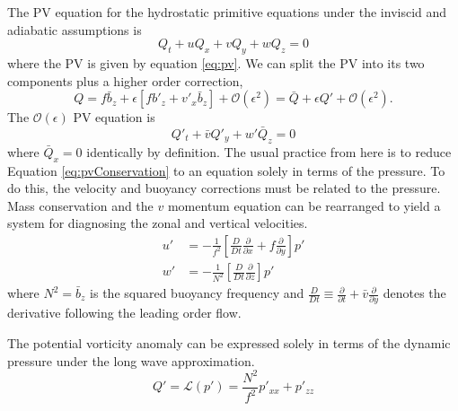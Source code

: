 \documentclass[12pt]{workjournal}
\begin{document}
   The PV equation for the hydrostatic primitive equations under the inviscid and adiabatic assumptions is
   \begin{equation}
   Q_t + uQ_x + vQ_y + wQ_z = 0 \label{eq:strat_pvconservation}
   \end{equation}
where the PV is given by equation \eqref{eq:pv}. We can split the PV into its two components plus a higher order correction,
  \begin{equation}
  Q =  f\bar{b}_z + \epsilon \left[  f b'_z +  v'_x \bar{b}_z \right] + \mathcal{O}(\epsilon^2) = \bar{Q} + \epsilon Q' + \mathcal{O}(\epsilon^2).
  \end{equation}
The $\mathcal{O}(\epsilon)$ PV equation is
  \begin{equation}
  Q'_t + \bar{v} Q'_y + w' \bar{Q}_z = 0 \label{eq:pvConservation}
  \end{equation}  
  where $\bar{Q}_x = 0$ identically by definition. The usual practice from here is to reduce Equation \eqref{eq:pvConservation} to an equation solely in terms of the pressure. To do this, the velocity and buoyancy corrections must be related to the pressure. Mass conservation and the $v$ momentum equation can be rearranged to yield a system for diagnosing the zonal and vertical velocities.
    \begin{subequations}
    \begin{align}
     u'  &= -\frac{1}{ f^2}\left[ \frac{D}{Dt}\frac{\partial}{\partial x}+ f \frac{\partial}{\partial y} \right]p' \\
   w'  &= -\frac{1}{N^2}\left[ \frac{D}{Dt}\frac{\partial }{\partial z}\right] p'
    \end{align}\label{eq:uAndw}
    \end{subequations}
where  $N^2 = \bar{b}_z$ is the squared buoyancy frequency and $\frac{D}{Dt} \equiv \frac{\partial}{\partial t} + \bar{v} \frac{\partial}{\partial y}$ denotes the derivative following the leading order flow.
    
  The potential vorticity anomaly can be expressed solely in terms of the dynamic pressure under the long wave approximation.
  \begin{equation}
  Q' = \mathcal{L}(p') =  \frac{N^2}{f^2} p'_{xx} + p'_{zz}  \label{eq:pvFromP}
  \end{equation}
  
\end{document}
